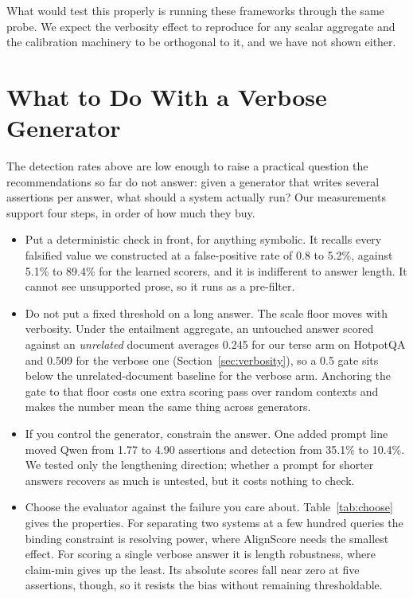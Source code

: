 \documentclass[11pt]{article}
\begin{document}
What would test this properly is running these frameworks through the same probe. We expect the verbosity effect to reproduce for any scalar aggregate and the calibration machinery to be orthogonal to it, and we have not shown either.

\section{What to Do With a Verbose Generator}
\label{sec:deploy}

The detection rates above are low enough to raise a practical question the recommendations so far do not answer: given a generator that writes several assertions per answer, what should a system actually run? Our measurements support four steps, in order of how much they buy.

\begin{itemize}
\item Put a deterministic check in front, for anything symbolic. It recalls every falsified value we constructed at a false-positive rate of 0.8 to 5.2\%, against 5.1\% to 89.4\% for the learned scorers, and it is indifferent to answer length. It cannot see unsupported prose, so it runs as a pre-filter.

\item Do not put a fixed threshold on a long answer. The scale floor moves with verbosity. Under the entailment aggregate, an untouched answer scored against an \emph{unrelated} document averages 0.245 for our terse arm on HotpotQA and 0.509 for the verbose one (Section~\ref{sec:verbosity}), so a 0.5 gate sits below the unrelated-document baseline for the verbose arm. Anchoring the gate to that floor costs one extra scoring pass over random contexts and makes the number mean the same thing across generators.

\item If you control the generator, constrain the answer. One added prompt line moved Qwen from 1.77 to 4.90 assertions and detection from 35.1\% to 10.4\%. We tested only the lengthening direction; whether a prompt for shorter answers recovers as much is untested, but it costs nothing to check.

\item Choose the evaluator against the failure you care about. Table~\ref{tab:choose} gives the properties. For separating two systems at a few hundred queries the binding constraint is resolving power, where AlignScore needs the smallest effect. For scoring a single verbose answer it is length robustness, where claim-min gives up the least. Its absolute scores fall near zero at five assertions, though, so it resists the bias without remaining thresholdable.
\end{itemize}
\end{document}

